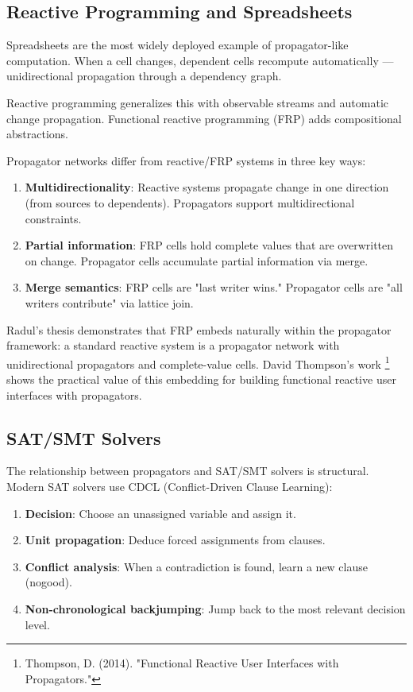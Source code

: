\documentclass[11pt]{article}
\begin{document}
\subsection{Reactive Programming and Spreadsheets}
\label{sec:orgd9706a2}

Spreadsheets are the most widely deployed example of propagator-like
computation. When a cell changes, dependent cells recompute
automatically --- unidirectional propagation through a dependency graph.

Reactive programming generalizes this with observable streams and
automatic change propagation. Functional reactive programming (FRP)
adds compositional abstractions.

Propagator networks differ from reactive/FRP systems in three key ways:

\begin{enumerate}
\item \textbf{Multidirectionality}: Reactive systems propagate change in one
direction (from sources to dependents). Propagators support
multidirectional constraints.
\item \textbf{Partial information}: FRP cells hold complete values that are
overwritten on change. Propagator cells accumulate partial
information via merge.
\item \textbf{Merge semantics}: FRP cells are "last writer wins." Propagator cells
are "all writers contribute" via lattice join.
\end{enumerate}

Radul's thesis demonstrates that FRP embeds naturally within the
propagator framework: a standard reactive system is a propagator network
with unidirectional propagators and complete-value cells. David
Thompson's work \footnote{Thompson, D. (2014). "Functional Reactive User
Interfaces with Propagators."} shows the practical value of this
embedding for building functional reactive user interfaces with
propagators.
\subsection{SAT/SMT Solvers}
\label{sec:org67eee2a}

The relationship between propagators and SAT/SMT solvers is structural.
Modern SAT solvers use CDCL (Conflict-Driven Clause Learning):

\begin{enumerate}
\item \textbf{Decision}: Choose an unassigned variable and assign it.
\item \textbf{Unit propagation}: Deduce forced assignments from clauses.
\item \textbf{Conflict analysis}: When a contradiction is found, learn a new
clause (nogood).
\item \textbf{Non-chronological backjumping}: Jump back to the most relevant
decision level.
\end{enumerate}
\end{document}
